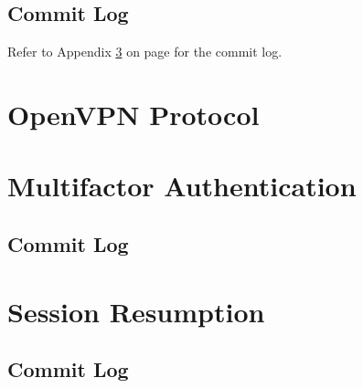 \documentclass[11pt,oneside]{book}
\begin{document}
\section{Commit Log}
Refer to Appendix \ref{MFA:Commit} on page \pageref{MFA:Commit} for the commit log.

\appendix
\chapter{OpenVPN Protocol}
\label{OpenVPN:Protocol}


\chapter{Multifactor Authentication}
\label{MFA:Commit}
\section{Commit Log}


\chapter{Session Resumption}
\label{Session:Commit}
\section{Commit Log}





\printindex
{}
\end{document}
